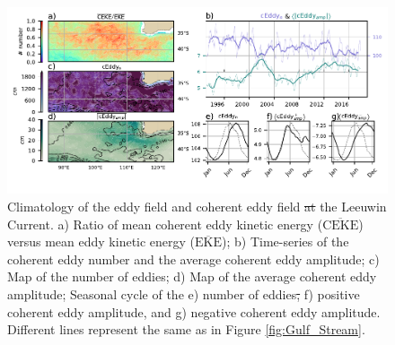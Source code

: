 \documentclass[draft,linenumbers]{agujournal2019}
\newcommand{\MEKE}{\overline{\textrm{EKE}}}
\newcommand{\EKE}{\textrm{EKE}}
\newcommand{\MCEKE}{\overline{\textrm{CEKE}}}
\providecommand{\DIFadd}[1]{{\protect\color{blue}\uwave{#1}}} %
\providecommand{\DIFdel}[1]{{\protect\color{red}\sout{#1}}}                      %
\providecommand{\DIFaddFL}[1]{\DIFadd{#1}} %
\providecommand{\DIFdelFL}[1]{\DIFdel{#1}} %
\providecommand{\DIFaddbeginFL}{} %
\providecommand{\DIFaddendFL}{} %
\providecommand{\DIFdelbeginFL}{} %
\providecommand{\DIFdelendFL}{} %
\begin{document}

	\begin{figure}
	    \centering
	    \includegraphics[width=1\textwidth]{figures/regional_ratios_and_stats_V3_0.pdf}
	    \caption{Climatology of the eddy field and coherent eddy field \DIFdelbeginFL \DIFdelFL{at }\DIFdelendFL \DIFaddbeginFL \DIFaddFL{in }\DIFaddendFL the Leeuwin Current. a) Ratio of mean coherent eddy kinetic energy ($\MCEKE$) versus mean eddy kinetic energy ($\MEKE$); b) Time-series of the coherent eddy number and the average coherent eddy amplitude; c) Map of the number of eddies; d) Map of the average coherent eddy amplitude; Seasonal cycle of the e) number of eddies\DIFdelbeginFL \DIFdelFL{, }\DIFdelendFL \DIFaddbeginFL \DIFaddFL{; }\DIFaddendFL f) positive coherent eddy amplitude, and g) negative coherent eddy amplitude. Different lines represent the same as in Figure \ref{fig:Gulf_Stream}.}
	    \label{fig:leeuwin_cycle}
	\end{figure}
\end{document}
